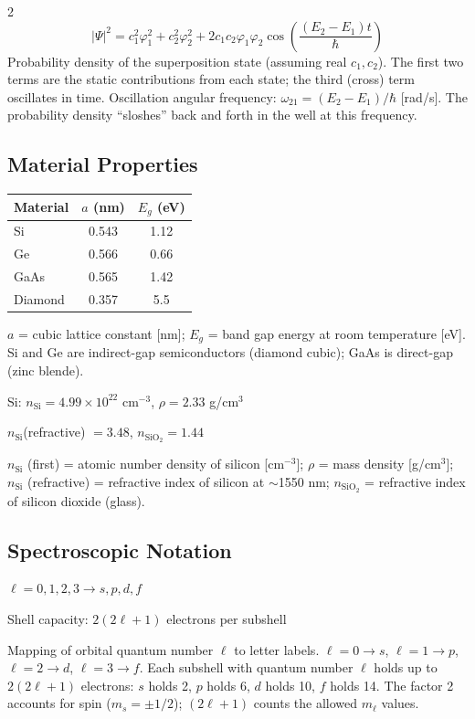 \documentclass[9pt]{extarticle}
\newcommand{\desc}[1]{{\small\color{desc}#1}}
\begin{document}
\begin{multicols}{2}
\[|\Psi|^2 = c_1^2\varphi_1^2 + c_2^2\varphi_2^2 + 2c_1c_2\varphi_1\varphi_2\cos\!\left(\frac{(E_2-E_1)t}{\hbar}\right)\]
\desc{Probability density of the superposition state (assuming real $c_1, c_2$). The first two terms are the static contributions from each state; the third (cross) term oscillates in time. Oscillation angular frequency: $\omega_{21} = (E_2 - E_1)/\hbar$ [rad/s]. The probability density ``sloshes'' back and forth in the well at this frequency.}

\subsection{Material Properties}
\renewcommand{\arraystretch}{1.15}
\begin{tabular}{@{}l c c@{}}
\toprule
Material & $a$ (nm) & $E_g$ (eV) \\
\midrule
Si & 0.543 & 1.12 \\
Ge & 0.566 & 0.66 \\
GaAs & 0.565 & 1.42 \\
Diamond & 0.357 & 5.5 \\
\bottomrule
\end{tabular}
\renewcommand{\arraystretch}{1.0}

\desc{$a$ = cubic lattice constant [nm]; $E_g$ = band gap energy at room temperature [eV]. Si and Ge are indirect-gap semiconductors (diamond cubic); GaAs is direct-gap (zinc blende).}

\smallskip
Si: $n_{\text{Si}} = 4.99\times10^{22}$ cm$^{-3}$, $\rho = 2.33$ g/cm$^3$

$n_{\text{Si}}$(refractive) $= 3.48$, \; $n_{\text{SiO}_2} = 1.44$

\desc{$n_{\text{Si}}$ (first) = atomic number density of silicon [cm$^{-3}$]; $\rho$ = mass density [g/cm$^3$]; $n_{\text{Si}}$ (refractive) = refractive index of silicon at $\sim$1550 nm; $n_{\text{SiO}_2}$ = refractive index of silicon dioxide (glass).}

\subsection{Spectroscopic Notation}
$\ell = 0,1,2,3 \to s,p,d,f$

Shell capacity: $2(2\ell+1)$ electrons per subshell

\desc{Mapping of orbital quantum number $\ell$ to letter labels. $\ell = 0 \to s$, $\ell = 1 \to p$, $\ell = 2 \to d$, $\ell = 3 \to f$. Each subshell with quantum number $\ell$ holds up to $2(2\ell+1)$ electrons: $s$ holds 2, $p$ holds 6, $d$ holds 10, $f$ holds 14. The factor 2 accounts for spin ($m_s = \pm 1/2$); $(2\ell+1)$ counts the allowed $m_\ell$ values.}


\end{multicols}
\end{document}
